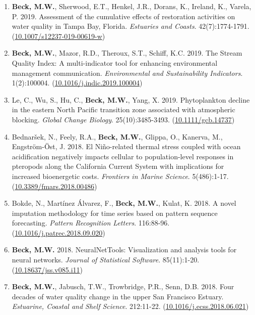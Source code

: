 \documentclass[letterpaper,12pt]{article}
\begin{document}
\begin{enumerate}
\item \textbf{Beck, M.W.}, Sherwood, E.T., Henkel, J.R., Dorans, K., Ireland, K., Varela, P. 2019. Assessment of the cumulative effects of restoration activities on water quality in Tampa Bay, Florida. \textit{Estuaries and Coasts}. 42(7):1774-1791. ({\footnotesize\href{https://doi.org/10.1007/s12237-019-00619-w}{10.1007/s12237-019-00619-w}})

\item \textbf{Beck, M.W.}, Mazor, R.D., Theroux, S.T., Schiff, K.C. 2019. The Stream Quality Index: A multi-indicator tool for enhancing environmental management communication. \textit{Environmental and Sustainability Indicators}. 1(2):100004. ({\footnotesize\href{https://doi.org/10.1016/j.indic.2019.100004}{10.1016/j.indic.2019.100004}})

\item Le, C., Wu, S., Hu, C., \textbf{Beck, M.W.}, Yang, X. 2019. Phytoplankton decline in the eastern {N}orth {P}acific transition zone associated with atmospheric blocking. \textit{Global Change Biology}. 25(10):3485-3493. ({\footnotesize\href{https://doi.org/10.1111/gcb.14737}{10.1111/gcb.14737}})

\item Bednar\v{s}ek, N., Feely, R.A., \textbf{Beck, M.W.}, Glippa, O., Kanerva, M., Engstr\"{o}m-\"{O}st, J. 2018. El Ni\~{n}o-related thermal stress coupled with ocean acidification negatively impacts cellular to population-level responses in pteropods along the {C}alifornia {C}urrent {S}ystem with implications for increased bioenergetic costs. \textit{Frontiers in Marine Science}. 5(486):1-17. ({\footnotesize\href{https://doi.org/10.3389/fmars.2018.00486}{10.3389/fmars.2018.00486}})

\item Bokde, N., Mart\'{i}nez \'{A}lvarez, F., \textbf{Beck, M.W.}, Kulat, K. 2018. A novel imputation methodology for time series based on pattern sequence forecasting. \textit{Pattern Recognition Letters}. 116:88-96. ({\footnotesize\href{https://doi.org/10.1016/j.patrec.2018.09.020}{10.1016/j.patrec.2018.09.020}})

\item \textbf{Beck, M.W.} 2018. NeuralNetTools: Visualization and analysis tools for neural networks. \textit{Journal of Statistical Software}. 85(11):1-20. ({\footnotesize\href{http://dx.doi.org/10.18637/jss.v085.i11}{10.18637/jss.v085.i11}})

\item \textbf{Beck, M.W.}, Jabusch, T.W., Trowbridge, P.R., Senn, D.B. 2018. Four decades of water quality change in the upper San Francisco Estuary. \textit{Estuarine, Coastal and Shelf Science}. 212:11-22. ({\footnotesize\href{https://doi.org/10.1016/j.ecss.2018.06.021}{10.1016/j.ecss.2018.06.021}})


\end{enumerate}
\end{document}
